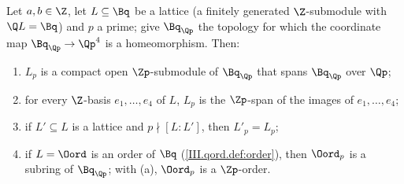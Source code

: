 Let $a,b\in\Z$, let $L\subseteq\Bq$ be a lattice (a finitely generated $\Z$-submodule with $\Q L=\Bq$) and $p$ a prime; give $\Bq_{\Qp}$ the topology for which the
coordinate map $\Bq_{\Qp}\to\Qp^4$ is a homeomorphism. Then:
\begin{enumerate}[label=(\alph*)]
\item $L_p$ is a compact open $\Zp$-submodule of $\Bq_{\Qp}$ that spans $\Bq_{\Qp}$ over $\Qp$;
\item for every $\Z$-basis $e_1,\dots,e_4$ of $L$, $L_p$ is the $\Zp$-span of the images of $e_1,\dots,e_4$;
\item if $L'\subseteq L$ is a lattice and $p\nmid[L:L']$, then $L'_p=L_p$;
\item if $L=\Oord$ is an order of $\Bq$ (\cref{III.qord.def:order}), then $\Oord_p$ is a subring of $\Bq_{\Qp}$; with (a), $\Oord_p$ is a $\Zp$-order.
\end{enumerate}
